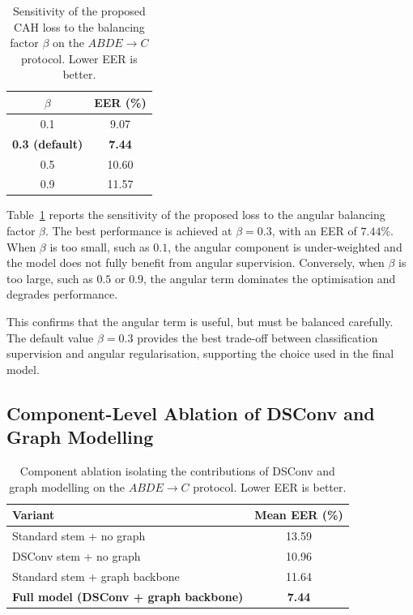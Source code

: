 \documentclass[10pt,journal,compsoc]{IEEEtran}
\begin{document}
\begin{table}[ht!]
    \centering
    \begin{tabular}{|c|c|}
        \hline
        $\beta$ & EER (\%) \\
        \hline
        0.1 & 9.07 \\
        \textbf{0.3 (default)} & \textbf{7.44} \\
        0.5 & 10.60 \\
        0.9 & 11.57 \\
        \hline
    \end{tabular}
    \caption{Sensitivity of the proposed CAH loss to the balancing factor $\beta$ on the $ABDE \rightarrow C$ protocol. Lower EER is better.}
    \label{tab:rebuttal_beta_ablation}
\end{table}

Table~\ref{tab:rebuttal_beta_ablation} reports the sensitivity of the proposed loss to the angular balancing factor $\beta$. The best performance is achieved at $\beta=0.3$, with an EER of $7.44\%$. When $\beta$ is too small, such as $0.1$, the angular component is under-weighted and the model does not fully benefit from angular supervision. Conversely, when $\beta$ is too large, such as $0.5$ or $0.9$, the angular term dominates the optimisation and degrades performance.

This confirms that the angular term is useful, but must be balanced carefully. The default value $\beta=0.3$ provides the best trade-off between classification supervision and angular regularisation, supporting the choice used in the final model.

\subsection{Component-Level Ablation of DSConv and Graph Modelling}

\begin{table}[ht!]
    \centering
    \begin{tabular}{|l|c|}
        \hline
        Variant & Mean EER (\%) \\
        \hline
        Standard stem + no graph & 13.59 \\
        DSConv stem + no graph & 10.96 \\
        Standard stem + graph backbone & 11.64 \\
        \textbf{Full model (DSConv + graph backbone)} & \textbf{7.44} \\
        \hline
    \end{tabular}
    \caption{Component ablation isolating the contributions of DSConv and graph modelling on the $ABDE \rightarrow C$ protocol. Lower EER is better.}
    \label{tab:rebuttal_component_ablation}
\end{table}
\end{document}
